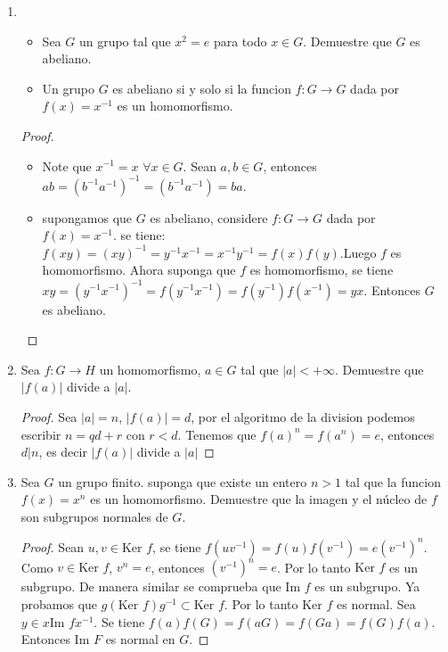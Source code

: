 \documentclass{article}
\theoremstyle{break}
\begin{document}
\begin{enumerate}
\begin{proof}
		\end{proof}
		
		\item
		
		\begin{itemize}
			\item Sea $G$ un grupo tal que $x^2=e$ para todo $x\in G$. Demuestre que $G$ es abeliano.
			
			\item Un grupo $G$ es abeliano si y solo si la funcion $f:G\rightarrow G$ dada por $f(x)=x^{-1}$ es un homomorfismo.
		\end{itemize}
		
		\begin{proof}
			
			\begin{itemize}
				\item Note que $x^{-1}=x$ $\forall x\in G$. Sean $a,b\in G$, entonces $ab=(b^{-1}a^{-1})^{-1}=(b^{-1}a^{-1})=ba$.
				
				\item supongamos que $G$ es abeliano, considere $f:G\rightarrow G$ dada por $f(x)=x^{-1}$. se tiene: $f(xy)=(xy)^{-1}=y^{-1}x^{-1}=x^{-1}y^{-1}=f(x)f(y)$.Luego $f$ es homomorfismo. Ahora suponga que $f$ es homomorfismo, se tiene $xy=(y^{-1}x^{-1})^{-1}=f(y^{-1}x^{-1})=f(y^{-1})f(x^{-1})=yx$. Entonces $G$ es abeliano.
			\end{itemize}
		\end{proof}
		
		\item Sea $f:G\rightarrow H$ un homomorfismo, $a\in G$ tal que $|a|<+\infty$. Demuestre que $|f(a)|$ divide a $|a|$.
		
		\begin{proof}
			Sea $|a|=n$, $|f(a)|=d$, por el algoritmo de la division podemos escribir $n=qd+r$ con $r<d$. Tenemos que $f(a)^n=f(a^n)=e$, entonces $d|n$, es decir $|f(a)|$ divide a $|a|$
		\end{proof}
		
		\item Sea $G$ un grupo finito. suponga que existe un entero $n>1$ tal que la funcion $f(x)=x^n$ es un homomorfismo. Demuestre que la imagen y el n\'ucleo de $f$ son subgrupos normales de $G$.
		
		\begin{proof}
			Sean $u,v\in\mbox{Ker }f$, se tiene $f(uv^{-1})=f(u)f(v^{-1})=e(v^{-1})^n$. Como $v\in\mbox{Ker }f$, $v^n=e$, entonces $(v^{-1})^n=e$. Por lo tanto $\mbox{Ker }f$ es un subgrupo. De manera similar se comprueba que $\mbox{Im }f$ es un subgrupo. Ya probamos que $g(\mbox{Ker }f)g^{-1}\subset\mbox{Ker }f$. Por lo tanto $\mbox{Ker }f$ es normal. Sea $y\in x\mbox{Im }fx^{-1}$.  Se tiene $f(a)f(G)=f(aG)=f(Ga)=f(G)f(a)$. Entonces $\mbox{Im }F$ es normal en $G$.
		\end{proof}
		

\end{enumerate}
\end{document}
